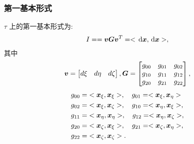 \documentclass{beamer}
\numberwithin{subsection}{section}
\begin{document}
\begin{frame}
    \frametitle{第一基本形式}
    $\tau$ 上的第一基本形式为:
    \begin{align*}
        I =={\boldsymbol v}{\boldsymbol G}{\boldsymbol v}^T = <\,\mathrm d {\boldsymbol x}, \,\mathrm d {\boldsymbol x}> ,
    \end{align*}
    其中
    \begin{align*}
        {\boldsymbol v} =  
        \begin{bmatrix}
        d\xi & d\eta & d\zeta
    \end{bmatrix},
        {\boldsymbol G} = 
        \begin{bmatrix}
            g_{00} & g_{01} & g_{02} \\
            g_{10} & g_{11} & g_{12} \\
            g_{20} & g_{21} & g_{22}
        \end{bmatrix},
    \end{align*}
    \begin{align*}
        g_{00} = & <{\boldsymbol x}_\xi, {\boldsymbol x}_\xi>,\quad
        g_{01} =  <{\boldsymbol x}_\xi, {\boldsymbol x}_\eta> \\
        g_{02} = & <{\boldsymbol x}_\xi, {\boldsymbol x}_\zeta>,\quad
        g_{10} =  <{\boldsymbol x}_\eta,{\boldsymbol x}_\xi> ,\\
        g_{11} = & <{\boldsymbol x}_\eta,{\boldsymbol x}_\eta>,\quad
        g_{12} =  <{\boldsymbol x}_\eta,{\boldsymbol x}_\zeta> ,\\
        g_{20} = & <{\boldsymbol x}_\zeta,{\boldsymbol x}_\xi> ,\quad
        g_{21} =  <{\boldsymbol x}_\zeta,{\boldsymbol x}_\eta>, \\
        g_{22} = & <{\boldsymbol x}_\zeta,{\boldsymbol x}_\zeta>.
    \end{align*}
\end{frame}
\end{document}
